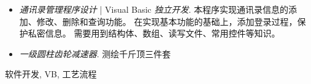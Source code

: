 \begin{experiences}
{\begin{itemize}
				  		\item \emph{通讯录管理程序设计} | Visual Basic  \emph{独立开发}. 
						  		本程序实现通讯录信息的添加、修改、删除和查询功能。
						  		在实现基本功能的基础上，添加登录过程，保护私密信息。
						  		需要用到结构体、数组、读写文件、常用控件等知识。
					     \item \emph{一级圆柱齿轮减速器}. 测绘千斤顶三件套		
				  	\end{itemize}
				  }
				  {软件开发, VB, 工艺流程}
	
		
\end{experiences}
